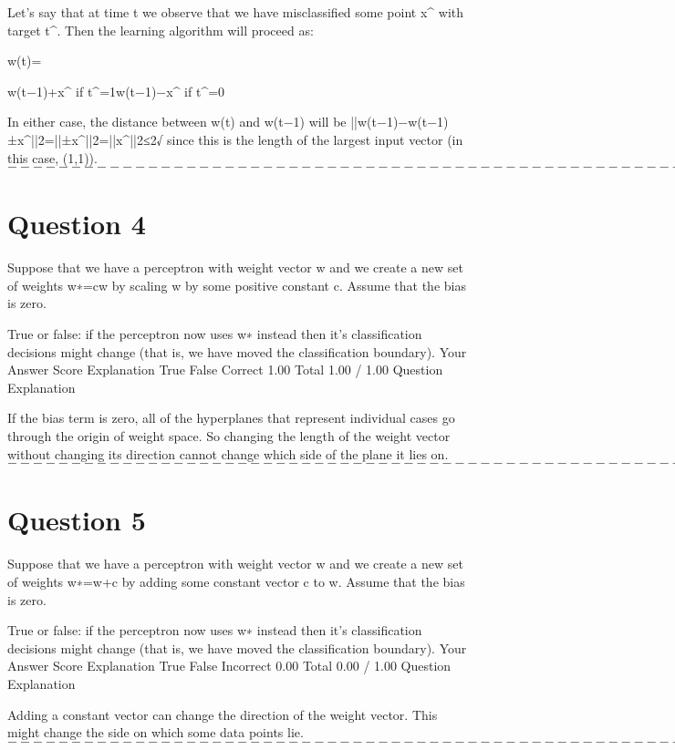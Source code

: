 Let's say that at time t we observe that we have misclassified some point x^ with target t^. Then the learning algorithm will proceed as: 

w(t)={w(t−1)+x^ if t^=1w(t−1)−x^ if t^=0 

In either case, the distance between w(t) and w(t−1) will be ||w(t−1)−w(t−1)±x^||2=||±x^||2=||x^||2≤2√ since this is the length of the largest input vector (in this case, (1,1)).
$----------------------------------------------------------------------------$
\newpage
\section*{Question 4}
Suppose that we have a perceptron with weight vector w and we create a new set of weights w∗=cw by scaling w by some positive constant c. Assume that the bias is zero. 

True or false: if the perceptron now uses w∗ instead then it's classification decisions might change (that is, we have moved the classification boundary).
Your Answer		Score	Explanation
True			
False	Correct	1.00	
Total		1.00 / 1.00	
Question Explanation

If the bias term is zero, all of the hyperplanes that represent individual cases go through the origin of weight space. 
So changing the length of the weight vector without changing its direction cannot change which side of the plane it lies on.
$----------------------------------------------------------------------------$
\newpage
\section*{Question 5}
Suppose that we have a perceptron with weight vector w and we create a new set of weights w∗=w+c by adding some constant vector c to w. Assume that the bias is zero. 

True or false: if the perceptron now uses w∗ instead then it's classification decisions might change (that is, we have moved the classification boundary).
Your Answer		Score	Explanation
True			
False	Incorrect	0.00	
Total		0.00 / 1.00	
Question Explanation

Adding a constant vector can change the direction of the weight vector. This might change the side on which some data points lie.
$----------------------------------------------------------------------------$
\newpage
}
